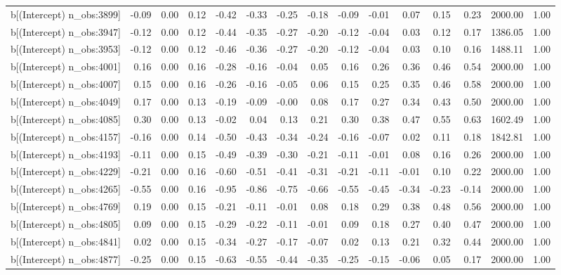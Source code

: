 \begin{table}[ht]
\begin{tabular}{rrrrrrrrrrrrrrr}
  b[(Intercept) n\_obs:3899] & -0.09 & 0.00 & 0.12 & -0.42 & -0.33 & -0.25 & -0.18 & -0.09 & -0.01 & 0.07 & 0.15 & 0.23 & 2000.00 & 1.00 \\ 
  b[(Intercept) n\_obs:3947] & -0.12 & 0.00 & 0.12 & -0.44 & -0.35 & -0.27 & -0.20 & -0.12 & -0.04 & 0.03 & 0.12 & 0.17 & 1386.05 & 1.00 \\ 
  b[(Intercept) n\_obs:3953] & -0.12 & 0.00 & 0.12 & -0.46 & -0.36 & -0.27 & -0.20 & -0.12 & -0.04 & 0.03 & 0.10 & 0.16 & 1488.11 & 1.00 \\ 
  b[(Intercept) n\_obs:4001] & 0.16 & 0.00 & 0.16 & -0.28 & -0.16 & -0.04 & 0.05 & 0.16 & 0.26 & 0.36 & 0.46 & 0.54 & 2000.00 & 1.00 \\ 
  b[(Intercept) n\_obs:4007] & 0.15 & 0.00 & 0.16 & -0.26 & -0.16 & -0.05 & 0.06 & 0.15 & 0.25 & 0.35 & 0.46 & 0.58 & 2000.00 & 1.00 \\ 
  b[(Intercept) n\_obs:4049] & 0.17 & 0.00 & 0.13 & -0.19 & -0.09 & -0.00 & 0.08 & 0.17 & 0.27 & 0.34 & 0.43 & 0.50 & 2000.00 & 1.00 \\ 
  b[(Intercept) n\_obs:4085] & 0.30 & 0.00 & 0.13 & -0.02 & 0.04 & 0.13 & 0.21 & 0.30 & 0.38 & 0.47 & 0.55 & 0.63 & 1602.49 & 1.00 \\ 
  b[(Intercept) n\_obs:4157] & -0.16 & 0.00 & 0.14 & -0.50 & -0.43 & -0.34 & -0.24 & -0.16 & -0.07 & 0.02 & 0.11 & 0.18 & 1842.81 & 1.00 \\ 
  b[(Intercept) n\_obs:4193] & -0.11 & 0.00 & 0.15 & -0.49 & -0.39 & -0.30 & -0.21 & -0.11 & -0.01 & 0.08 & 0.16 & 0.26 & 2000.00 & 1.00 \\ 
  b[(Intercept) n\_obs:4229] & -0.21 & 0.00 & 0.16 & -0.60 & -0.51 & -0.41 & -0.31 & -0.21 & -0.11 & -0.01 & 0.10 & 0.22 & 2000.00 & 1.00 \\ 
  b[(Intercept) n\_obs:4265] & -0.55 & 0.00 & 0.16 & -0.95 & -0.86 & -0.75 & -0.66 & -0.55 & -0.45 & -0.34 & -0.23 & -0.14 & 2000.00 & 1.00 \\ 
  b[(Intercept) n\_obs:4769] & 0.19 & 0.00 & 0.15 & -0.21 & -0.11 & -0.01 & 0.08 & 0.18 & 0.29 & 0.38 & 0.48 & 0.56 & 2000.00 & 1.00 \\ 
  b[(Intercept) n\_obs:4805] & 0.09 & 0.00 & 0.15 & -0.29 & -0.22 & -0.11 & -0.01 & 0.09 & 0.18 & 0.27 & 0.40 & 0.47 & 2000.00 & 1.00 \\ 
  b[(Intercept) n\_obs:4841] & 0.02 & 0.00 & 0.15 & -0.34 & -0.27 & -0.17 & -0.07 & 0.02 & 0.13 & 0.21 & 0.32 & 0.44 & 2000.00 & 1.00 \\ 
  b[(Intercept) n\_obs:4877] & -0.25 & 0.00 & 0.15 & -0.63 & -0.55 & -0.44 & -0.35 & -0.25 & -0.15 & -0.06 & 0.05 & 0.17 & 2000.00 & 1.00 \\ 

\end{tabular}
\end{table}
